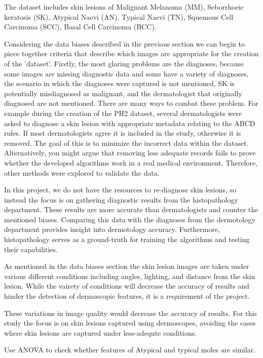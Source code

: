 The dataset includes skin lesions of Malignant Melanoma (MM), Seborrhoeic keratosis (SK), Atypical Naevi (AN), Typical Naevi (TN), Squemous Cell Carcinoma (SCC), Basal Cell Carcinoma (BCC). 

Considering the data biases described in the previous section we can begin to piece together criteria that describe which images are appropriate for the creation of the 'dataset'. Firstly, the most glaring problems are the diagnoses, because some images are missing diagnostic data and some have a variety of diagnoses, the scenario in which the diagnoses were captured is not mentioned, 
SK is potentially misdiagnosed as malignant, and the dermatologist that originally diagnosed are not mentioned. There are many ways to combat these problem. For example during the creation of the PH2 dataset\cite{mendonca2013}, several dermatologists were asked to diagnose a skin lesion with appropriate metadata relating to the ABCD rules. If most dermatologists agree it is included in the study, otherwise it is removed. The goal of this is to minimize the incorrect data within the dataset. Alternatively, you might argue that removing less adequate records fails to prove whether the developed algorithms work in a real medical environment. Therefore, other methods were explored to validate the data.

In this project, we do not have the resources to re-diagnose skin lesions, so instead the focus is on gathering diagnostic results from the histopathology department. These results are more accurate than dermatologists\cite{} and counter the mentioned biases. Comparing this data with the diagnoses from the dermotology department provides insight into dermotology accuracy. Furthermore, histopathology serves as a ground-truth for training the algorithms and testing their capabilities.

As mentioned in the data biases section the skin lesion images are taken under various different conditions including angles, lighting, and distance from the skin lesion. While the vairety of conditions will decrease the accuracy of results and hinder the detection of dermoscopic features, it is a requirement of the project. 

These variations in image quality would decrease the accuracy of results. For this study the focus is on skin lesions captured using dermoscopes, avoiding the cases where skin lesions are captured under less-adequte conditions.


Use ANOVA to check whether features of Atypical and typical moles are similar.

